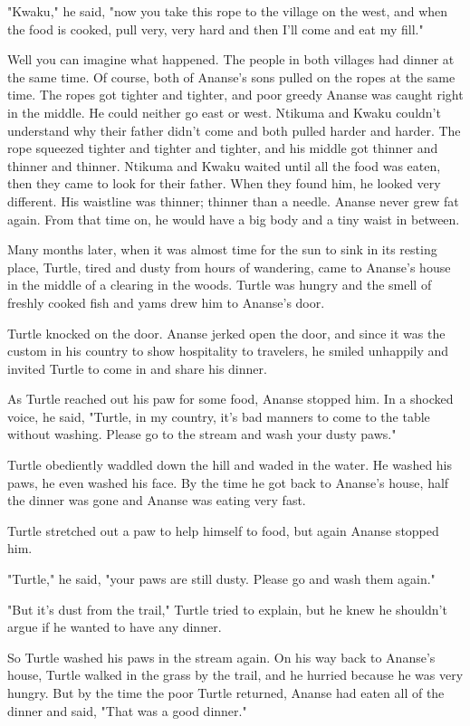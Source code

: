 "Kwaku," he said, "now you take this rope to the village on the west, and when the food is cooked, pull very, very hard and then I'll come and eat my fill."

Well you can imagine what happened. The people in both villages had dinner at the same time. Of course, both of Ananse's sons pulled on the ropes at the same time. The ropes got tighter and tighter, and poor greedy Ananse was caught right in the middle. He could neither go east or west. Ntikuma and Kwaku couldn't understand why their father didn't come and both pulled harder and harder. The rope squeezed tighter and tighter and tighter, and his middle got thinner and thinner and thinner. Ntikuma and Kwaku waited until all the food was eaten, then they came to look for their father. When they found him, he looked very different. His waistline was thinner; thinner than a needle. Ananse never grew fat again. From that time on, he would have a big body and a tiny waist in between.

Many months later, when it was almost time for the sun to sink in its resting place, Turtle, tired and dusty from hours of wandering, came to Ananse's house in the middle of a clearing in the woods. Turtle was hungry and the smell of freshly cooked fish and yams drew him to Ananse's door.

Turtle knocked on the door. Ananse jerked open the door, and since it was the custom in his country to show hospitality to travelers, he smiled unhappily and invited Turtle to come in and share his dinner.

As Turtle reached out his paw for some food, Ananse stopped him. In a shocked voice, he said, "Turtle, in my country, it's bad manners to come to the table without washing. Please go to the stream and wash your dusty paws."

Turtle obediently waddled down the hill and waded in the water. He washed his paws, he even washed his face. By the time he got back to Ananse's house, half the dinner was gone and Ananse was eating very fast.

Turtle stretched out a paw to help himself to food, but again Ananse stopped him.

"Turtle," he said, "your paws are still dusty. Please go and wash them again."

"But it's dust from the trail," Turtle tried to explain, but he knew he shouldn't argue if he wanted to have any dinner.

So Turtle washed his paws in the stream again. On his way back to Ananse's house, Turtle walked in the grass by the trail, and he hurried because he was very hungry. But by the time the poor Turtle returned, Ananse had eaten all of the dinner and said, "That was a good dinner."

